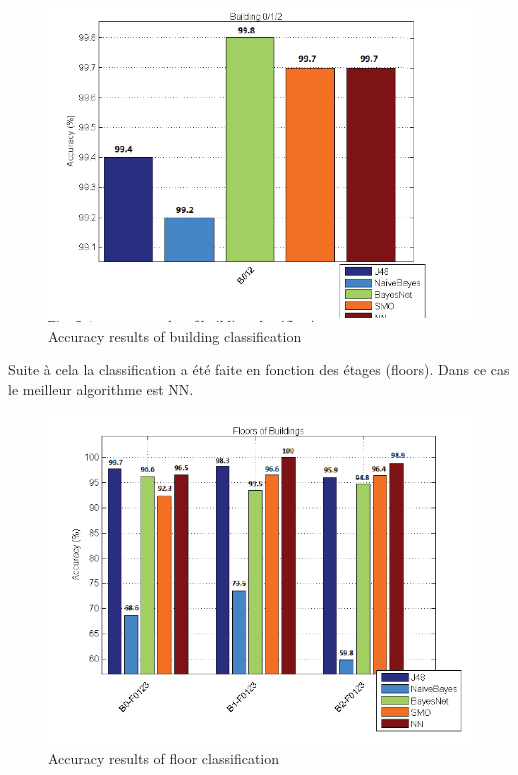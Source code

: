 \begin{figure}[H]
	\begin{center}
		\includegraphics[scale=1]{figures/bluildingClassification.png}
		\caption{Accuracy results of building classification}
		\label{fig:builClass} %
	\end{center}
\end{figure}

Suite à cela la classification a été faite en fonction des étages (floors). Dans ce cas le meilleur algorithme est NN. 

\begin{figure}[H]
	\begin{center}
		\includegraphics[scale=1]{figures/floorClassification.png}
		\caption{Accuracy results of floor classification}
		\label{fig:floorClass} %
	\end{center}
\end{figure}

